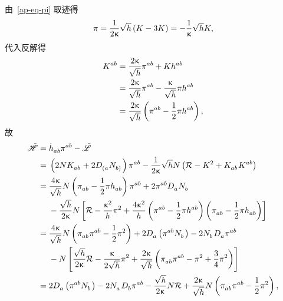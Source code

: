 		\begin{Proof}
			\label{ap-eq-ADM_H}
			由~\eqref{ap-eq-pi} 取迹得
			\begin{equation}
				\pi = \frac{1}{2\upkappa} \sqrt{h} \left( K - 3 K \right) = - \frac{1}{\upkappa} \sqrt{h} K,
			\end{equation}
			代入反解得
			\begin{equation}
				\begin{split}
					\tensor{K}{^a^b} &= \frac{2\gkappa}{\sqrt{h}} \tensor{\pi}{^a^b} + K \tensor{h}{^a^b}\\
					&= \frac{2\gkappa}{\sqrt{h}} \tensor{\pi}{^a^b} - \frac{\gkappa}{\sqrt{h}} \pi \tensor{h}{^a^b}\\
					&= \frac{2\gkappa}{\sqrt{h}} \left( \tensor{\pi}{^a^b} - \frac{1}{2} \pi \tensor{h}{^a^b} \right),
				\end{split}
			\end{equation}
			故
			\begin{equation}
				\begin{split}
					\Had ={}& \tensor{\dot{h}}{_a_b} \tensor{\pi}{^a^b} - \Lad\\
					={}& \left( 2 N \tensor{K}{_a_b} + 2 \tensor{D}{_{(a}} \tensor{N}{_{b)}} \right) \tensor{\pi}{^a^b} - \frac{1}{2\gkappa} \sqrt{h} N \left( \spacecurR - K^2 + \tensor{K}{_a_b} \tensor{K}{^a^b} \right)\\
					={}& \frac{4\gkappa}{\sqrt{h}} N \left( \tensor{\pi}{_a_b} - \frac{1}{2} \pi \tensor{h}{_a_b} \right) \tensor{\pi}{^a^b} + 2 \tensor{\pi}{^a^b} \tensor{D}{_a} \tensor{N}{_b}\\
					& {} - \frac{\sqrt{h}}{2\gkappa} N \left[ \spacecurR - \frac{\gkappa^2}{h} \pi^2 + \frac{4\gkappa^2}{h} \left( \tensor{\pi}{^a^b} - \frac{1}{2} \pi \tensor{h}{^a^b} \right) \left( \tensor{\pi}{_a_b} - \frac{1}{2} \pi \tensor{h}{_a_b} \right) \right]\\
					={} & \frac{4\gkappa}{\sqrt{h}} N \left( \tensor{\pi}{_a_b} \tensor{\pi}{^a^b} - \frac{1}{2} \pi^2 \right) + 2 \tensor{D}{_a} \left( \tensor{\pi}{^a^b} \tensor{N}{_b} \right) - 2 \tensor{N}{_b} \tensor{D}{_a} \tensor{\pi}{^a^b}\\
					& {} - N \left[ \frac{\sqrt{h}}{2\gkappa} \spacecurR - \frac{\gkappa}{2\sqrt{h}} \pi^2 + \frac{2\gkappa}{\sqrt{h}} \left( \tensor{\pi}{_a_b} \tensor{\pi}{^a^b} - \pi^2 + \frac{3}{4} \pi^2 \right) \right]\\
					={} & 2 \tensor{D}{_a} \left( \tensor{\pi}{^a^b} \tensor{N}{_b} \right) - 2 \tensor{N}{_a} \tensor{D}{_b} \tensor{\pi}{^a^b} - \frac{\sqrt{h}}{2\gkappa} N \spacecurR + \frac{2\gkappa}{\sqrt{h}} N \left( \tensor{\pi}{_a_b} \tensor{\pi}{^a^b} - \frac{1}{2} \pi^2 \right),

\end{split}
\end{equation}
\end{Proof}
